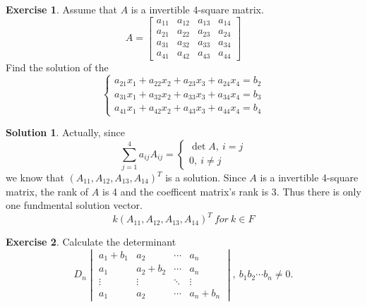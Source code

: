 \documentclass{article}
\theoremstyle{definition}
\newtheorem{exercise}{Exercise}[section]
\newtheorem{solution}{Solution}[exercise]
\begin{document}
\begin{exercise}
    Assume that $A$ is a invertible 4-square matrix.
    $$
    A=
    \begin{bmatrix}
        a_{11} & a_{12} & a_{13} & a_{14}\\
        a_{21} & a_{22} & a_{23} & a_{24}\\
        a_{31} & a_{32} & a_{33} & a_{34}\\
        a_{41} & a_{42} & a_{43} & a_{44}
    \end{bmatrix}
    $$
    Find the solution of the 
    $$
    \begin{cases}
        a_{21}x_{1}+a_{22}x_{2}+a_{23}x_{3}+a_{24}x_{4}=b_{2}\\
        a_{31}x_{1}+a_{32}x_{2}+a_{33}x_{3}+a_{34}x_{4}=b_{3}\\
        a_{41}x_{1}+a_{42}x_{2}+a_{43}x_{3}+a_{44}x_{4}=b_{4}
    \end{cases}
    $$
\end{exercise}

\begin{solution}
    Actually, since 
    $$\sum_{j=1}^{4}a_{ij}A_{ij}=\begin{cases}
        \det A,\ i=j\\
        0,\ i\neq j\end{cases}$$
    we know that $(A_{11},A_{12},A_{13},A_{14})^{T}$ is a solution.
    Since $A$ is a invertible 4-square matrix, the rank of $A$ is 4 and 
    the coefficent matrix's rank is 3. Thus there is only one fundmental solution 
    vector.
    $$k(A_{11},A_{12},A_{13},A_{14})^{T}\ for\ k\in F$$
\end{solution}

\begin{exercise}
    Calculate the determinant 
    $$D_{n}
    \begin{vmatrix}
        a_{1}+b_{1}&a_{2}&\cdots&a_{n}\\
        a_{1}&a_{2}+b_{2}&\cdots&a_{n}\\
        \vdots&\vdots&\ddots&\vdots\\
        a_{1}&a_{2}&\cdots&a_{n}+b_{n}
    \end{vmatrix}
    ,\ b_{1}b_{2}\cdots b_{n}\neq 0.$$
\end{exercise}
\end{document}
